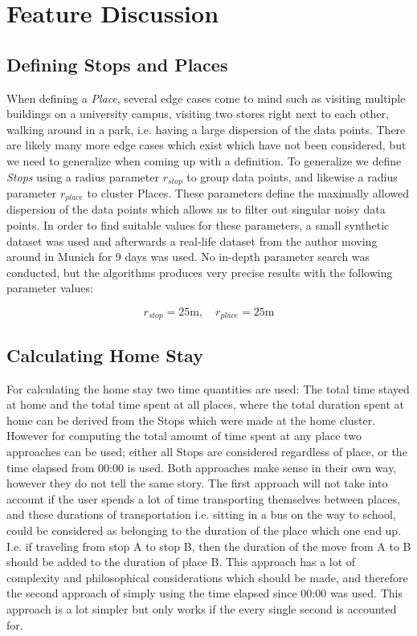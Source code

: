 \section{Feature Discussion}

\subsection{Defining Stops and Places}
When defining a \textit{Place}, several edge cases come to mind such as visiting multiple buildings on a university campus, visiting two stores right next to each other, walking around in a park, i.e. having a large dispersion of the data points. There are likely many more edge cases which exist which have not been considered, but we need to generalize when coming up with a definition. To generalize we define \textit{Stops} using a radius parameter $r_{stop}$ to group data points, and likewise a radius parameter $r_{place}$ to cluster Places. These parameters define the maximally allowed dispersion of the data points which allows us to filter out singular noisy data points. In order to find suitable values for these parameters, a small synthetic dataset was used and afterwards a real-life dataset from the author moving around in Munich for 9 days was used. No in-depth parameter search was conducted, but the algorithms produces very precise results with the following parameter values:

$$r_{stop} = 25 \text{m}, \quad r_{place} = 25 \text{m}$$

\subsection{Calculating Home Stay}
For calculating the home stay two time quantities are used: The total time stayed at home and the total time spent at all places, where the total duration spent at home can be derived from the Stops which were made at the home cluster. However for computing the total amount of time spent at any place two approaches can be used; either all Stops are considered regardless of place, or the time elapsed from 00:00 is used. Both approaches make sense in their own way, however they do not tell the same story. The first approach will not take into account if the user spends a lot of time transporting themselves between places, and these durations of transportation i.e. sitting in a bus on the way to school, could be considered as belonging to the duration of the place which one end up. I.e. if traveling from stop A to stop B, then the duration of the move from A to B should be added to the duration of place B. This approach has a lot of complexity and philosophical considerations which should be made, and therefore the second approach of simply using the time elapsed since 00:00 was used. This approach is a lot simpler but only works if the every single second is accounted for.

